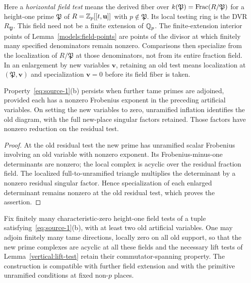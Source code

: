 Here a \emph{horizontal field test} means the derived fiber over
$k(\mathfrak P)=\operatorname{Frac}(R/\mathfrak P)$ for a height-one prime
$\mathfrak P$ of $R=\mathbb Z_p[[t,\mathbf u]]$ with $p\notin\mathfrak P$.
Its local testing ring is the DVR $R_{\mathfrak P}$.  This field
need not be a finite extension of $\mathbb Q_p$.  The finite-extension
interior points of Lemma~\ref{models:field-points} are points of
the divisor at which finitely many specified denominators remain
nonzero.  Comparisons then specialize from the localization of
$R/\mathfrak P$ at those denominators, not from its entire
fraction field.  In an enlargement by new variables $\mathbf v$, retaining
an old test means localization at $(\mathfrak P,\mathbf v)$ and
specialization $\mathbf v=0$ before its field fiber is taken.

\begin{lemma}\label{vertical:enlargement}
Property~\eqref{eq:source-1}(b) persists when further tame primes
are adjoined, provided each has a nonzero Frobenius exponent
in the preceding artificial variables.  On setting the new
variables to zero, unramified inflation identifies the old
diagram, with the full new-place singular factors retained.
Those factors have nonzero reduction on the residual test.
\end{lemma}

\begin{proof}
At the old residual test the new prime has unramified scalar
Frobenius involving an old variable with nonzero exponent.
Its Frobenius-minus-one determinants are nonzero; the local
complex is acyclic over the residual fraction field.  The
localized full-to-unramified triangle multiplies the
determinant by a nonzero residual singular factor.  Hence
specialization of each enlarged determinant remains nonzero
at the old residual test, which proves the assertion.
\end{proof}

\begin{lemma}\label{vertical:horizontal-directions}
Fix finitely many characteristic-zero height-one field tests
of a tuple satisfying~\eqref{eq:source-1}(b), with at least two
old artificial variables.  One may adjoin finitely many tame
directions, locally zero on all old support, so that the new
prime complexes are acyclic at all these fields and the
necessary lift tests of Lemma~\ref{vertical:lift-test} retain
their commutator-spanning property.  The construction is
compatible with further field extension and with the
primitive unramified conditions at fixed non-$p$ places.
\end{lemma}

